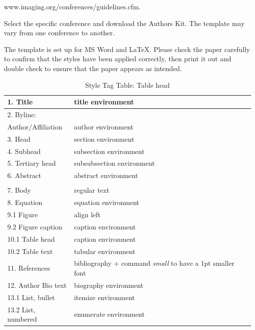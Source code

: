\documentclass[letterpaper,twocolumn,fleqn]{article}
\begin{document}
www.imaging.org/conferences/guidelines.cfm. 

Select the specific conference and download the Authors Kit. The
template may vary from one conference to another.

The template is set up for MS Word and LaTeX. Please check the paper
carefully to confirm that the styles have been applied correctly, then
print it out and double check to ensure that the paper appears as
intended.

\begin{table}[!h]
\caption{Style Tag Table: Table head}
\label{tab:fonts}
\begin{center}       
\begin{tabular}{|p{}|p{}|} 
\hline
1. Title& title environment \\ \hline
2. Byline: & \\
Author/Affiliation & author environment \\ \hline
3. Head & section environment \\ \hline
4. Subhead & subsection environment \\ \hline
5. Tertiary head & subsubsection environment \\ \hline
6. Abstract & abstract environment \\ \hline 
& \\ \hline
7. Body & regular text\\ \hline
8. Equation & equation environment\\ \hline
9.1 Figure & align left \\ \hline
9.2 Figure caption & caption environment \\ \hline
10.1 Table head & caption environment \\ \hline
10.2 Table text & tabular environment \\ \hline
11. References & bibliography + 
command \emph{small} to have a 1pt smaller font\\ \hline
12. Author Bio text & biography environment\\ \hline
13.1 List, bullet & itemize environment\\ \hline
13.2 List, numbered & enumerate environment \\ \hline
\end{tabular}
\end{center}
\end{table} 

\end{document}
